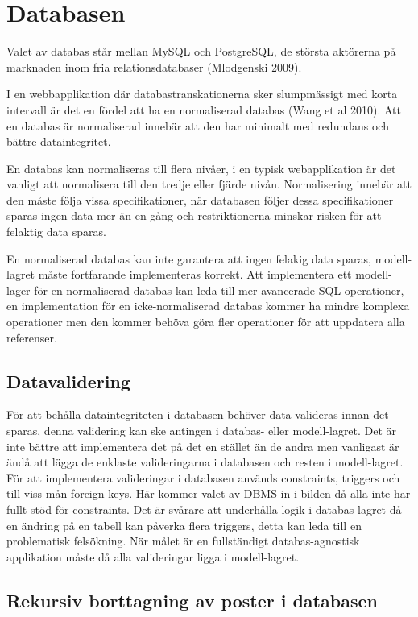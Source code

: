 \section{Databasen}

Valet av databas står mellan MySQL och PostgreSQL, de största aktörerna på marknaden inom fria relationsdatabaser (Mlodgenski 2009).

I en webbapplikation där databastranskationerna sker slumpmässigt med korta intervall är det en fördel att ha en normaliserad databas (Wang et al 2010). Att en databas är normaliserad innebär att den har minimalt med redundans och bättre dataintegritet.

En databas kan normaliseras till flera nivåer, i en typisk webapplikation är det vanligt att normalisera till den tredje eller fjärde nivån. Normalisering innebär att den måste följa vissa specifikationer, när databasen följer dessa specifikationer sparas ingen data mer än en gång och restriktionerna minskar risken för att  felaktig data sparas.

En normaliserad databas kan inte garantera att ingen felakig data sparas, modell-lagret måste fortfarande implementeras korrekt. Att implementera ett modell-lager för en normaliserad databas kan leda till mer avancerade SQL-operationer, en implementation för en icke-normaliserad databas kommer ha mindre komplexa operationer men den kommer behöva göra fler operationer för att uppdatera alla referenser.

\subsection{Datavalidering}
För att behålla dataintegriteten i databasen behöver data valideras innan det sparas, denna validering kan ske antingen i databas- eller modell-lagret.
Det är inte bättre att implementera det på det en stället än de andra men vanligast är ändå att lägga de enklaste valideringarna i databasen och resten i modell-lagret. För att implementera valideringar i databasen används constraints, triggers och till viss mån foreign keys. Här kommer valet av DBMS in i bilden då alla inte har fullt stöd för constraints.
Det är svårare att underhålla logik i databas-lagret då en ändring på en tabell kan påverka flera triggers, detta kan leda till en problematisk felsökning.
När målet är en fullständigt databas-agnostisk applikation måste då alla valideringar ligga i modell-lagret. 

\subsection{Rekursiv borttagning av poster i databasen}

